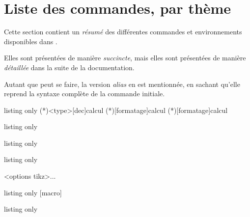 
\part{Liste des commandes, par thème}

\begin{noteblock}
 Cette section contient un \textit{résumé} des différentes commandes et environnements disponibles dans .

Elles sont présentées de manière \textit{succincte}, mais elles sont présentées de manière \textit{détaillée} dans la suite de la documentation.

Autant que peut se faire, la version \textit{alias} en  est mentionnée, en sachant qu'elle reprend la syntaxe complète de la commande initiale.
\end{noteblock}

\begin{PresCodeTexPL}{listing only}
\pflnum(*)<type>[dec]{calcul}                      %
\pflnumfrac(*)[formatage]{calcul}
\pflnumrad(*)[formatage]{calcul}
\end{PresCodeTexPL}

\begin{PresCodeTexPL}{listing only}
\end{PresCodeTexPL}

\begin{PresCodeTexPL}{listing only}
\end{PresCodeTexPL}

\begin{PresCodeTexPL}{listing only}
\begin{RepIntervalles}[clés]<options tikz>...\end{RepIntervalles}
\end{PresCodeTexPL}

\begin{PresCodeTexPL}{listing only}
[macro]
\pflresolapproch
\end{PresCodeTexPL}

\begin{PresCodeTexPL}{listing only}
\pflsoltvi
\end{PresCodeTexPL}

